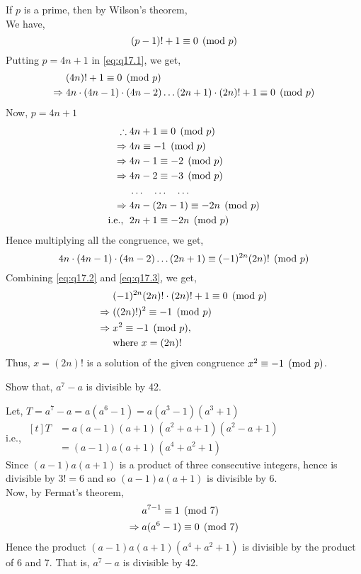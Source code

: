 \documentclass[12pt,class=book,crop=false]{standalone}
\begin{document}
\begin{soln}
    If $ p $ is a prime, then by Wilson's theorem,\\
    We have,
    \begin{equation}
        (p-1)!+1\equiv 0 \pmod{p}\label{eq:q17.1}
    \end{equation}
    Putting $ p=4n+1 $ in \eqref{eq:q17.1}, we get,
    \begin{align}
        & (4n)!+1\equiv 0 \pmod{p}\notag\\
        \Rightarrow\;& 4n\cdot(4n-1)\cdot(4n-2)\dots(2n+1)\cdot(2n)!+1\equiv 0 \pmod{p}\label{eq:q17.2}
    \end{align}
    Now, $ p=4n+1 $
    \begin{align*}
        \therefore\;&4n+1\equiv 0 \pmod{p}\\
        \Rightarrow\;&4n\equiv -1 \pmod{p}\\
        \Rightarrow\;&4n-1 \equiv -2 \pmod{p}\\
        \Rightarrow\;&4n-2 \equiv -3 \pmod{p}\\
        &\dots\quad \dots\quad \dots\\
        \Rightarrow\;&4n-(2n-1) \equiv -2n \pmod{p}\\
        \text{i.e., }\;&2n+1 \equiv -2n \pmod{p}
    \end{align*}
    Hence multiplying all the congruence, we get,
    \begin{equation}
        4n\cdot(4n-1)\cdot(4n-2)\dots(2n+1)\equiv (-1)^{2n}(2n)! \pmod{p}\label{eq:q17.3}
    \end{equation}
    Combining \eqref{eq:q17.2} and \eqref{eq:q17.3}, we get,
    \begin{align*}
        & (-1)^{2n} (2n)!\cdot(2n)!+1\equiv 0 \pmod{p}\\
        \Rightarrow\;& ((2n)!)^2 \equiv -1 \pmod{p}\\
        \Rightarrow\;& x^2 \equiv -1 \pmod{p},\\
        &\text{where } x=(2n)!
    \end{align*}
    Thus, $ x=(2n)! $ is a solution of the given congruence $ x^2\equiv -1 \pmod{p} $.
\end{soln}
\begin{qn}
    Show that, $ a^7-a $ is divisible by 42.
\end{qn}
\begin{soln}
    Let, $ T=a^7-a=a(a^6-1)=a(a^3-1)(a^3+1) $\\
    i.e., $ \begin{aligned}[t]
        T&= a(a-1)(a+1)(a^2+a+1)(a^2-a+1)\\
        &= (a-1)a(a+1)(a^4+a^2+1)
    \end{aligned} $\\
    Since $ (a-1)a(a+1) $ is a product of three consecutive integers, hence is divisible by $ 3!=6 $ and so $ (a-1)a(a+1) $ is divisible by 6.\\
    Now, by Fermat's theorem,
    \begin{align*}
        &a^{7-1} \equiv 1 \pmod{7}\\
        \Rightarrow\; &a(a^{6}-1) \equiv 0 \pmod{7}
    \end{align*}
    Hence the product $ (a-1)a(a+1)(a^4+a^2+1) $ is divisible by the product of $ 6 $ and 7. That is, $ a^7-a $ is divisible by 42.
\end{soln}
\end{document}
